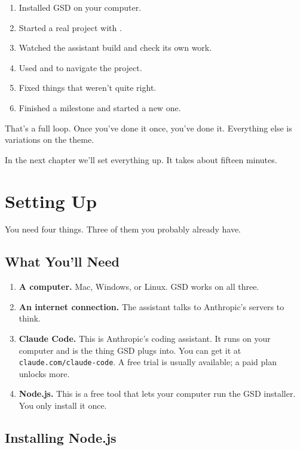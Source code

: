 \documentclass[11pt,letterpaper,openany]{book}
\begin{document}
\begin{enumerate}
  \item Installed GSD on your computer.
  \item Started a real project with .
  \item Watched the assistant build and check its own work.
  \item Used  and  to navigate the project.
  \item Fixed things that weren't quite right.
  \item Finished a milestone and started a new one.
\end{enumerate}

That's a full loop. Once you've done it once, you've done it. Everything
else is variations on the theme.

\bigskip
\noindent In the next chapter we'll set everything up. It takes about
fifteen minutes.

\chapter{Setting Up}

You need four things. Three of them you probably already have.

\section{What You'll Need}

\begin{enumerate}
  \item \textbf{A computer.} Mac, Windows, or Linux. GSD works on all three.
  \item \textbf{An internet connection.} The assistant talks to Anthropic's
        servers to think.
  \item \textbf{Claude Code.} This is Anthropic's coding assistant. It runs
        on your computer and is the thing GSD plugs into. You can get it at
        \texttt{claude.com/claude-code}. A free trial is usually available;
        a paid plan unlocks more.
  \item \textbf{Node.js.} This is a free tool that lets your computer run
        the GSD installer. You only install it once.
\end{enumerate}

\section{Installing Node.js}
\end{document}
